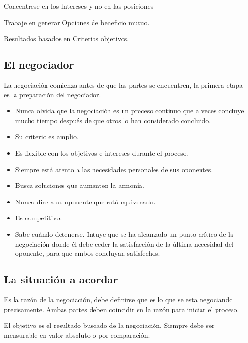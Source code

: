 \documentclass[titlepage,a4paper]{article}
\begin{document}
Concentrese en los Intereses y no en las posiciones

Trabaje en generar Opciones de beneficio mutuo.

Resultados basados en Criterios objetivos.

\subsection*{El negociador}
La negociación comienza antes de que las partes se encuentren, la primera etapa es la preparación del negociador.

\begin{itemize}
    \item Nunca olvida que la negociación es un proceso continuo que a veces concluye mucho tiempo después de que otros lo han considerado concluido.
    \item Su criterio es amplio.
    \item Es flexible con los objetivos e intereses durante el proceso.
    \item Siempre está atento a las necesidades personales de sus oponentes.
    \item Busca soluciones que aumenten la armonía.
    \item Nunca dice a su oponente que está equivocado.
    \item Es competitivo.
    \item Sabe cuándo detenerse. Intuye que se ha alcanzado un punto crítico de la negociación donde él debe ceder la satisfacción de la última necesidad del oponente, para que ambos concluyan satisfechos.
\end{itemize}

\subsection*{La situación a acordar}
Es la razón de la negociación, debe definirse que es lo que se esta negociando precisamente. Ambas partes deben coincidir en la razón para iniciar el proceso.

El objetivo es el resultado buscado de la negociación. Siempre debe ser mensurable en valor absoluto o por comparación.
\end{document}
